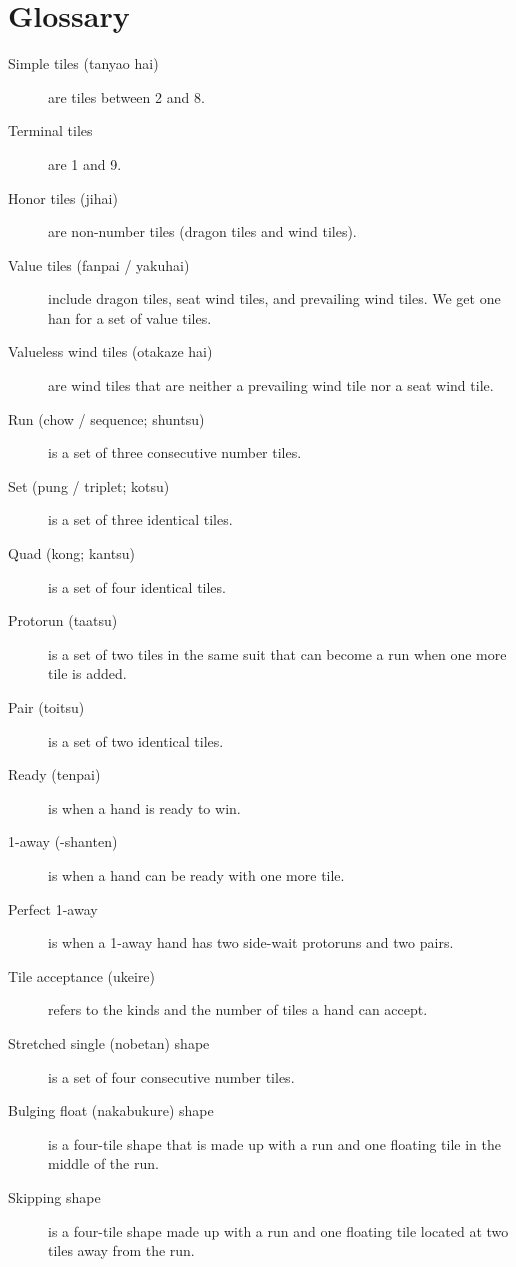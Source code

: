\clearpage

\section{Glossary}

\begin{description}
\item[Simple tiles ({\jap tanyao hai})] are tiles between 2 and 8.
\item[Terminal tiles] are 1 and 9.
\item[Honor tiles ({\jap jihai})] are non-number tiles (dragon tiles and wind tiles).
\item[Value tiles ({\jap fanpai} / {\jap yakuhai})] include dragon tiles, seat wind tiles, and prevailing wind tiles. We get one {\jap han} for a set of value tiles. 
\item[Valueless wind tiles ({\jap otakaze hai})] are wind tiles that are neither a prevailing wind tile nor a seat wind tile.
\item[Run (chow / sequence; {\jap shuntsu})] is a set of three consecutive number tiles.
\item[Set (pung / triplet; {\jap kotsu})] is a set of three identical tiles. 
\item[Quad (kong; {\jap kantsu})] is a set of four identical tiles. 
\item[Protorun ({\jap taatsu})] is a set of two tiles in the same suit that can become a run when one more tile is added. 
\item[Pair ({\jap toitsu})] is a set of two identical tiles. 
\item[Ready ({\jap tenpai})] is when a hand is ready to win. 
\item[1-away ({-shanten})] is when a hand can be ready with one more tile. 
\item[Perfect 1-away] is when a 1-away hand has two side-wait protoruns and two pairs.
\item[Tile acceptance ({\jap ukeire})] refers to the kinds and the number of tiles a hand can accept.
\item[Stretched single ({\jap nobetan}) shape] is a set of four consecutive number tiles. 
\item[Bulging float ({\jap nakabukure}) shape] is a four-tile shape that is made up with a run and one floating tile in the middle of the run.
\item[Skipping shape] is a four-tile shape made up with a run and one floating tile located at two tiles away from the run.
\end{description}
